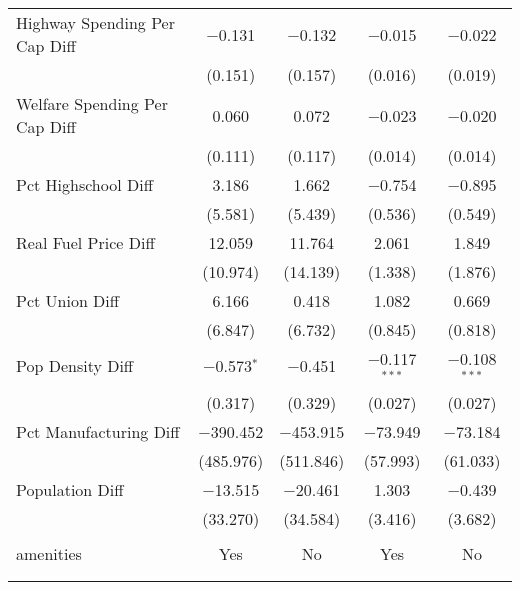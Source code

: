 \begin{table}[!htbp]
\begin{tabular}{@{\extracolsep{5pt}}lcccc}
  Highway Spending Per Cap Diff & $-$0.131 & $-$0.132 & $-$0.015 & $-$0.022 \\ 
  & (0.151) & (0.157) & (0.016) & (0.019) \\ 
  Welfare Spending Per Cap Diff & 0.060 & 0.072 & $-$0.023 & $-$0.020 \\ 
  & (0.111) & (0.117) & (0.014) & (0.014) \\ 
  Pct Highschool Diff & 3.186 & 1.662 & $-$0.754 & $-$0.895 \\ 
  & (5.581) & (5.439) & (0.536) & (0.549) \\ 
  Real Fuel Price Diff & 12.059 & 11.764 & 2.061 & 1.849 \\ 
  & (10.974) & (14.139) & (1.338) & (1.876) \\ 
  Pct Union Diff & 6.166 & 0.418 & 1.082 & 0.669 \\ 
  & (6.847) & (6.732) & (0.845) & (0.818) \\ 
  Pop Density Diff & $-$0.573$^{*}$ & $-$0.451 & $-$0.117$^{***}$ & $-$0.108$^{***}$ \\ 
  & (0.317) & (0.329) & (0.027) & (0.027) \\ 
  Pct Manufacturing Diff & $-$390.452 & $-$453.915 & $-$73.949 & $-$73.184 \\ 
  & (485.976) & (511.846) & (57.993) & (61.033) \\ 
  Population Diff & $-$13.515 & $-$20.461 & 1.303 & $-$0.439 \\ 
  & (33.270) & (34.584) & (3.416) & (3.682) \\ 
 \hline \\[-1.8ex] 
amenities & Yes & No & Yes & No \\ 
\hline \\[-1.8ex] 
\hline 
\hline \\[-1.8ex] 
\end{tabular} 
\end{table} 
